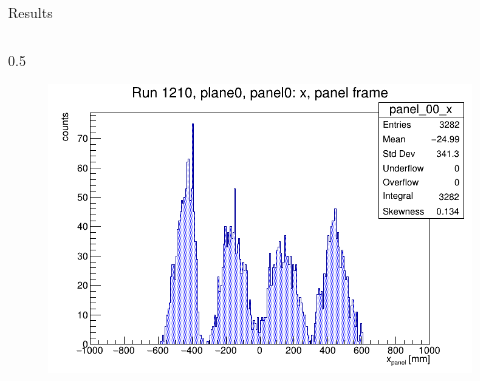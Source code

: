 \documentclass{beamer}[10pt]
\begin{document}
\begin{frame}{Results}
  \vspace{-3mm}
  \begin{columns}
    \begin{column}{0.5\framewidth}
      \begin{figure}[H]
        \centering
        \includegraphics[width= \textwidth]{figures/pdf/x_panel0.png}
        \label{fig:enter-label}
    \end{figure}
    \vspace{-12mm}


\end{column}
\end{columns}
\end{frame}
\end{document}
